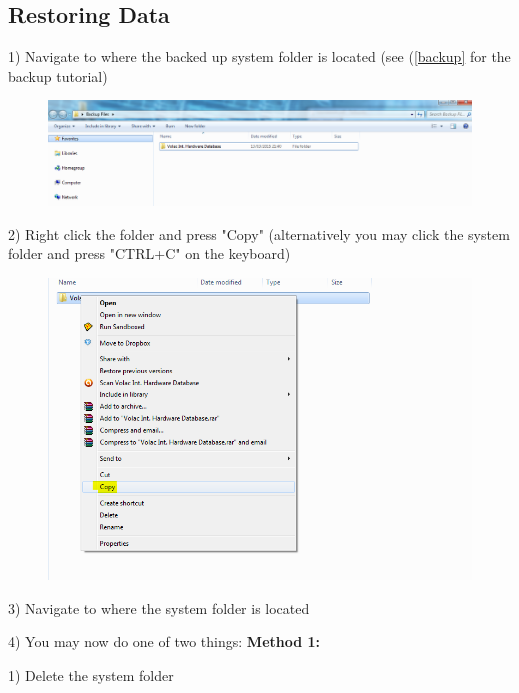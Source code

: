\subsection{Restoring Data}\label{restore}

1) Navigate to where the backed up system folder is located (see (\ref{backup} for the backup tutorial)

\begin{figure}[H]
    \includegraphics[width=\textwidth]{./Manual/Images/restore1.png}
\end{figure}

2) Right click the folder and press "Copy" (alternatively you may click the system folder and press "CTRL+C" on the keyboard)

\begin{figure}[H]
    \includegraphics[width=\textwidth]{./Manual/Images/restore2.png}
\end{figure}

3) Navigate to where the system folder is located

4) You may now do one of two things:
\newline
\textbf{Method 1:}

1) Delete the system folder

